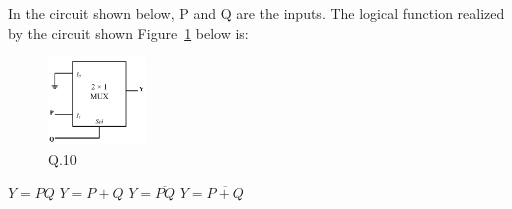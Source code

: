 \documentclass[a4, 11pt, addpoints]{exam}
\begin{document}
\begin{questions}
\question In the circuit shown below, P and Q are the inputs. The logical function realized by the circuit shown Figure~\ref{fig:2} below is:
\begin{figure}[H]
\centering
\includegraphics[width=0.23\textwidth]{mux}
\caption{Q.10}
\label{fig:2}
\end{figure}
\begin{oneparchoices}
    \choice $Y = PQ$
    \choice $Y=P+Q$
    \choice $Y = \overline{PQ}$
    \CorrectChoice $Y= \overline{P + Q}$
    
\end{oneparchoices}



\vspace{0.10in}

\end{questions}
\end{document}
